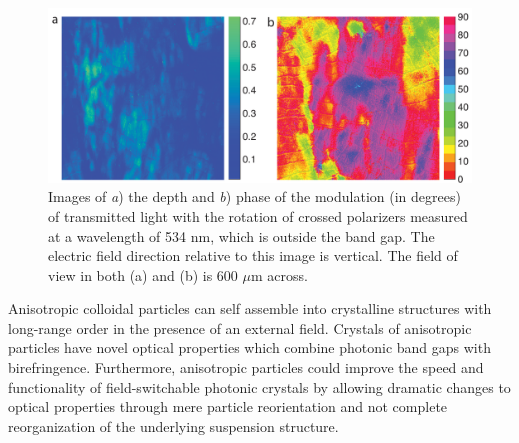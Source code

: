 \begin{figure}[htbp]
\centering
\includegraphics[width=1.0\textwidth]{figures/CsuppFigure10.pdf}
\caption{\label{fig:optics2}
  	Images of \emph{a}) the depth and \emph{b}) phase of the modulation (in degrees) of transmitted light with the rotation of crossed polarizers measured at a wavelength of 534 nm, which is outside the band gap. 	The electric field direction relative to this image is vertical. The field of view in both (a) and (b) is 600 $\mu$m across.}
\end{figure} 

Anisotropic colloidal particles can self assemble into crystalline structures with long-range order in the presence of an external field.
Crystals of anisotropic particles have novel optical properties which combine photonic band gaps with birefringence.
Furthermore, anisotropic particles could improve the speed and functionality of field-switchable photonic crystals by allowing dramatic changes to optical properties through mere particle reorientation and not complete reorganization of the underlying suspension structure.

